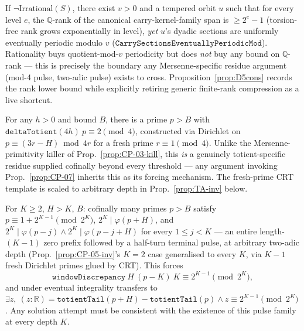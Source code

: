 \begin{prop}\label{prop:CP-02}
If $\neg\mathrm{Irrational}(S)$, there exist $v>0$ and a tempered orbit $u$ such that for every
level $e$, the $\mathbb Q$-rank of the canonical carry-kernel-family span is $\ge 2^e-1$ (torsion-free
rank grows exponentially in level), \emph{yet} $u$'s dyadic sections are uniformly eventually
periodic modulo $v$ ($\mathtt{CarrySectionsEventuallyPeriodicMod}$). Rationality buys
quotient-mod-$v$ periodicity but does \emph{not} buy any bound on $\mathbb Q$-rank — this is
precisely the boundary any Mersenne-specific residue argument (mod-4 pulse, two-adic pulse) exists
to cross. Proposition~\ref{prop:D5cons} records the rank lower bound while explicitly retiring
generic finite-rank compression as a live shortcut.
\ \ \\
\end{prop}

\begin{prop}\label{prop:CP-05-inv}
For any $h>0$ and bound $B$, there is a prime $p>B$ with $\mathtt{deltaTotient}(4h)\ p \equiv 2\pmod4$,
constructed via Dirichlet on $p\equiv(3r-H)\bmod 4r$ for a fresh prime $r\equiv1\pmod4$. Unlike the
Mersenne-primitivity killer of Prop.~\ref{prop:CP-03-kill}, this \emph{is} a genuinely
totient-specific residue supplied cofinally beyond every threshold — any argument invoking
Prop.~\ref{prop:CP-07} inherits this as its forcing mechanism. The fresh-prime CRT template is
scaled to arbitrary depth in Prop.~\ref{prop:TA-inv} below.
\ \ \\
\end{prop}

\begin{prop}\label{prop:TA-inv}
For $K\ge2$, $H>K$, $B$: cofinally many primes $p>B$ satisfy
$p\equiv1+2^{K-1}\pmod{2^K}$, $2^K\mid\varphi(p{+}H)$, and $2^K\mid\varphi(p{-}j)\wedge2^K\mid\varphi(p{-}j{+}H)$
for every $1\le j<K$ — an entire length-$(K{-}1)$ zero prefix followed by a half-turn terminal
pulse, at arbitrary two-adic depth (Prop.~\ref{prop:CP-05-inv}'s $K=2$ case generalised to every
$K$, via $K{-}1$ fresh Dirichlet primes glued by CRT). This forces
\[
\mathtt{windowDiscrepancy}\ H\ (p{-}K)\ K \equiv 2^{K-1}\pmod{2^K},
\]
and under eventual integrality transfers to $\exists z,\ (z:\mathbb R)=\mathtt{totientTail}(p{+}H)-\mathtt{totientTail}(p)\wedge z\equiv2^{K-1}\pmod{2^K}$.
Any solution attempt must be consistent with the existence of this pulse family at every depth $K$.
\ \ \\
\end{prop}

